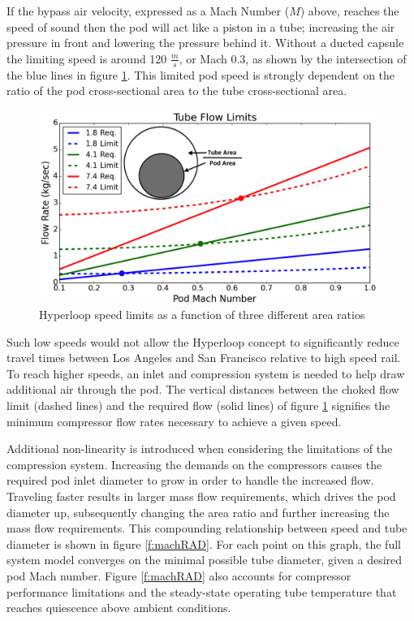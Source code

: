 \documentclass[heading.tex]{subfiles}
\begin{document}
If the bypass air velocity, expressed as a Mach Number ($M$) above, reaches the speed of sound then the pod will act like a piston in a tube;
increasing the air pressure in front and lowering the pressure behind it. Without a ducted capsule the limiting speed is around
120 $\frac{m}{s}$, or Mach 0.3, as shown by the intersection of the blue lines in figure \ref{f:flowLIMIT}.
This limited pod speed is strongly dependent on the ratio of the pod cross-sectional area to the tube cross-sectional area.

\begin{figure}[hbtp]
\centering
\includegraphics[width=\textwidth]{images/tube_flow_limit3.png}
\caption{Hyperloop speed limits as a function of three different area ratios}
\label{f:flowLIMIT}
\end{figure}

Such low speeds would not allow the Hyperloop concept to significantly reduce travel times between Los Angeles and San Francisco relative
to high speed rail. To reach higher speeds, an inlet and compression system is needed to help draw additional air through the pod.
The vertical distances between the choked flow limit (dashed lines) and the required flow (solid lines) of figure \ref{f:flowLIMIT}
signifies the minimum compressor flow rates necessary to achieve a given speed. 

Additional non-linearity is introduced when considering the limitations of the compression system. Increasing the demands on the compressors
causes the required pod inlet diameter to grow in order to handle the increased flow. Traveling faster results in larger mass flow requirements,
which drives the pod diameter up, subsequently changing the area ratio and further increasing the mass flow requirements.
This compounding relationship between 
speed and tube diameter is shown in figure \ref{f:machRAD}. For each point on this graph, the full system model converges on the minimal
possible tube diameter, given a desired pod Mach number. Figure \ref{f:machRAD} also accounts for compressor performance limitations and
the steady-state operating tube temperature that reaches quiescence above ambient conditions.
\end{document}
